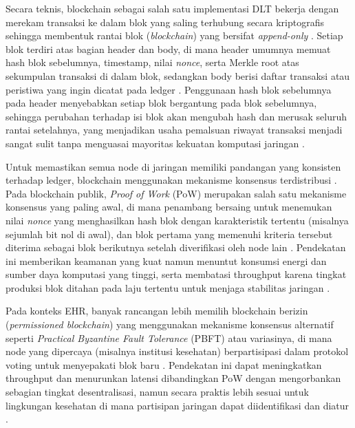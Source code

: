 Secara teknis, blockchain sebagai salah satu implementasi DLT bekerja dengan merekam transaksi ke dalam blok yang saling terhubung secara kriptografis sehingga membentuk rantai blok (\emph{blockchain}) yang bersifat \emph{append-only} \parencite{Ettaloui_2024_blockchain_ehr_slr,Mayer_2020_ehr_blockchain_slr}. 
Setiap blok terdiri atas bagian header dan body, di mana header umumnya memuat hash blok sebelumnya, timestamp, nilai \emph{nonce}, serta Merkle root atas sekumpulan transaksi di dalam blok, sedangkan body berisi daftar transaksi atau peristiwa yang ingin dicatat pada ledger \parencite{Yang_2021_blockchain_architecture_ehr}. 
Penggunaan hash blok sebelumnya pada header menyebabkan setiap blok bergantung pada blok sebelumnya, sehingga perubahan terhadap isi blok akan mengubah hash dan merusak seluruh rantai setelahnya, yang menjadikan usaha pemalsuan riwayat transaksi menjadi sangat sulit tanpa menguasai mayoritas kekuatan komputasi jaringan \parencite{Mayer_2020_ehr_blockchain_slr}. 

Untuk memastikan semua node di jaringan memiliki pandangan yang konsisten terhadap ledger, blockchain menggunakan mekanisme konsensus terdistribusi \parencite{Ettaloui_2024_blockchain_ehr_slr}. 
Pada blockchain publik, \emph{Proof of Work} (PoW) merupakan salah satu mekanisme konsensus yang paling awal, di mana penambang bersaing untuk menemukan nilai \emph{nonce} yang menghasilkan hash blok dengan karakteristik tertentu (misalnya sejumlah bit nol di awal), dan blok pertama yang memenuhi kriteria tersebut diterima sebagai blok berikutnya setelah diverifikasi oleh node lain \parencite{Yang_2021_blockchain_architecture_ehr,Mayer_2020_ehr_blockchain_slr}. 
Pendekatan ini memberikan keamanan yang kuat namun menuntut konsumsi energi dan sumber daya komputasi yang tinggi, serta membatasi throughput karena tingkat produksi blok ditahan pada laju tertentu untuk menjaga stabilitas jaringan \parencite{Ettaloui_2024_blockchain_ehr_slr}. 

Pada konteks EHR, banyak rancangan lebih memilih blockchain berizin (\emph{permissioned blockchain}) yang menggunakan mekanisme konsensus alternatif seperti \emph{Practical Byzantine Fault Tolerance} (PBFT) atau variasinya, di mana node yang dipercaya (misalnya institusi kesehatan) berpartisipasi dalam protokol voting untuk menyepakati blok baru \parencite{Mayer_2020_ehr_blockchain_slr,Yang_2021_blockchain_architecture_ehr}. 
Pendekatan ini dapat meningkatkan throughput dan menurunkan latensi dibandingkan PoW dengan mengorbankan sebagian tingkat desentralisasi, namun secara praktis lebih sesuai untuk lingkungan kesehatan di mana partisipan jaringan dapat diidentifikasi dan diatur \parencite{Ettaloui_2024_blockchain_ehr_slr}. 

